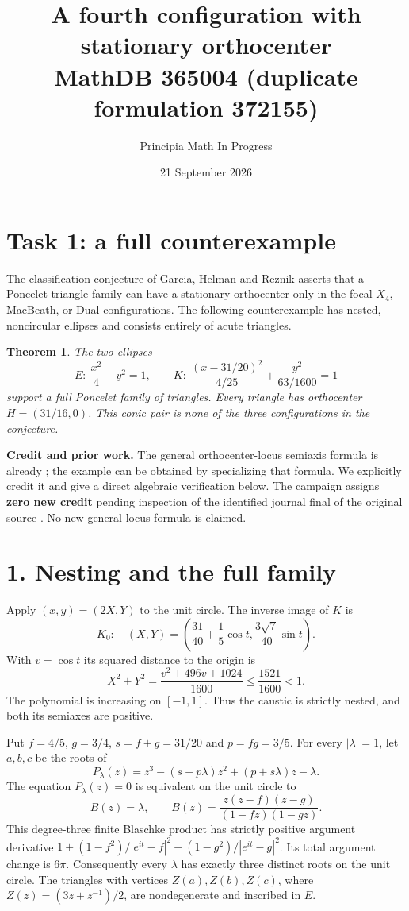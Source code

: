\documentclass[11pt]{article}
\title{A fourth configuration with stationary orthocenter\\
\large MathDB 365004 (duplicate formulation 372155)}
\author{Principia Math In Progress}
\date{21 September 2026}
\newtheorem{theorem}{Theorem}
\begin{document}
\maketitle
\section*{Task 1: a full counterexample}
The classification conjecture of Garcia, Helman and Reznik
\cite[Conjecture 1, p.6]{special} asserts that a Poncelet triangle family
can have a stationary orthocenter only in the focal-$X_4$, MacBeath, or
Dual configurations. The following counterexample has nested,
noncircular ellipses and consists entirely of acute triangles.

\begin{theorem}
The two ellipses
\[
 E:\ \frac{x^2}{4}+y^2=1,\qquad
 K:\ \frac{(x-31/20)^2}{4/25}+\frac{y^2}{63/1600}=1
\]
support a full Poncelet family of triangles. Every triangle has
orthocenter $H=(31/16,0)$. This conic pair is none of the three
configurations in the conjecture.
\end{theorem}

\noindent\textbf{Credit and prior work.}
The general orthocenter-locus semiaxis formula is already
\cite[Theorem 3]{general}; the example can be obtained by specializing
that formula. We explicitly credit it and give a direct algebraic
verification below. The campaign assigns \textbf{zero new credit}
pending inspection of the identified journal final of the original
source \cite{original}. No new general locus formula is claimed.

\section*{1. Nesting and the full family}
Apply $(x,y)=(2X,Y)$ to the unit circle. The inverse image of $K$ is
\[
 K_0:\quad (X,Y)=
 \left(\frac{31}{40}+\frac15\cos t,\frac{3\sqrt7}{40}\sin t\right).
\]
With $v=\cos t$ its squared distance to the origin is
\[
 X^2+Y^2=\frac{v^2+496v+1024}{1600}
       \leq\frac{1521}{1600}<1 .
\]
The polynomial is increasing on $[-1,1]$. Thus the caustic is strictly
nested, and both its semiaxes are positive.

\newpage
Put $f=4/5$, $g=3/4$, $s=f+g=31/20$ and $p=fg=3/5$. For every
$|\lambda|=1$, let $a,b,c$ be the roots of
\begin{equation}\label{cubic}
 P_\lambda(z)=z^3-(s+p\lambda)z^2+(p+s\lambda)z-\lambda.
\end{equation}
The equation $P_\lambda(z)=0$ is equivalent on the unit circle to
\[
 B(z)=\lambda,\qquad
 B(z)=\frac{z(z-f)(z-g)}{(1-fz)(1-gz)}.
\]
This degree-three finite Blaschke product has strictly positive
argument derivative
$1+(1-f^2)/|e^{it}-f|^2+(1-g^2)/|e^{it}-g|^2$.
Its total argument change is $6\pi$. Consequently every $\lambda$
has exactly three distinct roots on the unit circle. The triangles
with vertices $Z(a),Z(b),Z(c)$, where
$Z(z)=(3z+z^{-1})/2$, are nondegenerate and inscribed in $E$.
\end{document}
